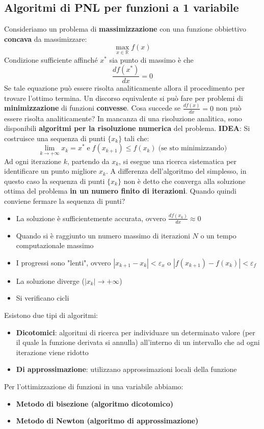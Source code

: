 \documentclass[12pt]{article}
\begin{document}
\subsection{Algoritmi di PNL per funzioni a 1 variabile}
Consideriamo un problema di \textbf{massimizzazione} con una funzione obbiettivo \textbf{concava} da massimizzare:
$$\max_{x \in \mathbb{R}}f(x)$$
Condizione sufficiente affinché $x^*$ sia punto di massimo è che
$$\frac{df(x^*)}{dx} = 0$$
Se tale equazione può essere risolta analiticamente allora il procedimento per trovare l'ottimo termina.
Un discorso equivalente si può fare per problemi di \textbf{minimizzazione} di funzioni \textbf{convesse}.
Cosa succede se $\frac{df(x)}{dx} = 0$ non può essere risolta analiticamente?
In mancanza di una risoluzione analitica, sono disponibili \textbf{algoritmi per la risoluzione numerica} del problema. \newline
\textbf{IDEA}: Si costruisce una sequenza di punti $\{x_k\}$ tali che:
$$\lim_{k \rightarrow +\infty} x_k = x^* \; \textrm{e} \; f(x_{k+1}) \leq f(x_k) \; \textrm{(se sto minimizzando)}$$
Ad ogni iterazione $k$, partendo da $x_k$, si esegue una ricerca sistematica per identificare un punto migliore $x_k$.
A differenza dell'algoritmo del simplesso, in questo caso la sequenza di punti $\{x_k\}$ non è detto che converga alla soluzione ottima del problema
\textbf{in un numero finito di iterazioni}. Quando quindi conviene fermare la sequenza di punti?
\begin{itemize}
    \item La soluzione è sufficientemente accurata, ovvero $\frac{df(x_k)}{dx} \approx 0$
    \item Quando si è raggiunto un numero massimo di iterazioni $N$ o un tempo computazionale massimo
    \item I progressi sono "lenti", ovvero $|x_{k+1} - x_k| < \varepsilon_x$ o $|f(x_{k+1}) - f(x_k)| < \varepsilon_f$
    \item La soluzione diverge ($|x_k| \rightarrow +\infty$)
    \item Si verificano cicli 
\end{itemize}
Esistono due tipi di algoritmi:
\begin{itemize}
    \item \textbf{Dicotomici}: algoritmi di ricerca per individuare un determinato valore (per il quale la funzione derivata si annulla) all'interno di un intervallo che ad ogni iterazione viene ridotto
    \item \textbf{Di approssimazione}: utilizzano approssimazioni locali della funzione
\end{itemize}
Per l'ottimizzazione di funzioni in una variabile abbiamo:
\begin{itemize}
    \item \textbf{Metodo di bisezione (algoritmo dicotomico)}
    \item \textbf{Metodo di Newton (algoritmo di approssimazione)}
\end{itemize}
\end{document}
